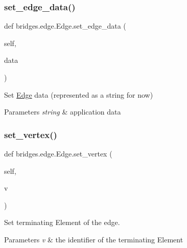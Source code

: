 \subsubsection{\texorpdfstring{set\+\_\+edge\+\_\+data()}{set\_edge\_data()}}
{\footnotesize\ttfamily def bridges.\+edge.\+Edge.\+set\+\_\+edge\+\_\+data (\begin{DoxyParamCaption}\item[{}]{self,  }\item[{}]{data }\end{DoxyParamCaption})}



Set \mbox{\hyperlink{classbridges_1_1edge_1_1_edge}{Edge}} data (represented as a string for now) 


\begin{DoxyParams}{Parameters}
{\em string} & application data \\
\hline
\end{DoxyParams}
\mbox{\label{classbridges_1_1edge_1_1_edge_aba4adfc7164d409a02b8a65af9c5df50}} 
\subsubsection{\texorpdfstring{set\+\_\+vertex()}{set\_vertex()}}
{\footnotesize\ttfamily def bridges.\+edge.\+Edge.\+set\+\_\+vertex (\begin{DoxyParamCaption}\item[{}]{self,  }\item[{}]{v }\end{DoxyParamCaption})}



Set terminating Element of the edge. 


\begin{DoxyParams}{Parameters}
{\em v} & the identifier of the terminating Element \\
\hline
\end{DoxyParams}
\mbox{\label{classbridges_1_1edge_1_1_edge_ac8dfd60ebfa380ac02b6e9fd8bcb13a1}} 
